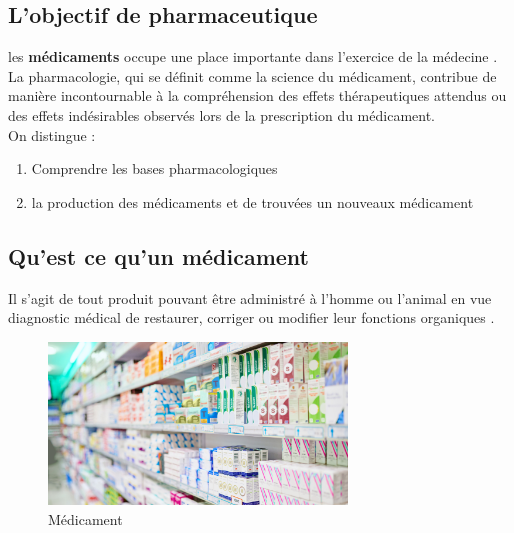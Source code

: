 \documentclass[12pt]{report}
\begin{document}
\subsection{L'objectif de pharmaceutique}
les \textbf{médicaments} occupe une place importante dans l’exercice de la médecine \cite{ref7}.\\
La pharmacologie, qui se définit comme la science du médicament, contribue de manière incontournable à la compréhension des effets thérapeutiques attendus ou des effets indésirables observés lors de la prescription du médicament.\\On distingue :
\begin{enumerate}
\item Comprendre les bases pharmacologiques 
\item  la production des médicaments et de trouvées un nouveaux médicament

\end{enumerate}

\subsection{Qu'est ce qu'un médicament}
Il s'agit  de tout produit pouvant être administré à l'homme ou l'animal en vue  diagnostic médical  de restaurer, corriger ou modifier leur fonctions organiques \cite{ref7} . 
\begin{figure}[h]
\begin{center}
\includegraphics[width=300]{med.jpg}
\caption{Médicament}
\end{center}

\end{figure}
\end{document}
